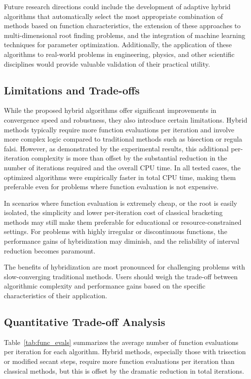 \documentclass[amsmath, amssymb, aps]{revtex4-2}
\begin{document}
Future research directions could include the development of adaptive hybrid algorithms that automatically select the most appropriate combination of methods based on function characteristics, the extension of these approaches to multi-dimensional root finding problems, and the integration of machine learning techniques for parameter optimization. Additionally, the application of these algorithms to real-world problems in engineering, physics, and other scientific disciplines would provide valuable validation of their practical utility.

\subsection{Limitations and Trade-offs}
While the proposed hybrid algorithms offer significant improvements in convergence speed and robustness, they also introduce certain limitations. Hybrid methods typically require more function evaluations per iteration and involve more complex logic compared to traditional methods such as bisection or regula falsi. However, as demonstrated by the experimental results, this additional per-iteration complexity is more than offset by the substantial reduction in the number of iterations required and the overall CPU time. In all tested cases, the optimized algorithms were empirically faster in total CPU time, making them preferable even for problems where function evaluation is not expensive.

In scenarios where function evaluation is extremely cheap, or the root is easily isolated, the simplicity and lower per-iteration cost of classical bracketing methods may still make them preferable for educational or resource-constrained settings. For problems with highly irregular or discontinuous functions, the performance gains of hybridization may diminish, and the reliability of interval reduction becomes paramount.

The benefits of hybridization are most pronounced for challenging problems with slow-converging traditional methods. Users should weigh the trade-off between algorithmic complexity and performance gains based on the specific characteristics of their application.

\subsection*{Quantitative Trade-off Analysis}

Table~\ref{tab:func_evals} summarizes the average number of function evaluations per iteration for each algorithm. Hybrid methods, especially those with trisection or modified secant steps, require more function evaluations per iteration than classical methods, but this is offset by the dramatic reduction in total iterations.
\end{document}
